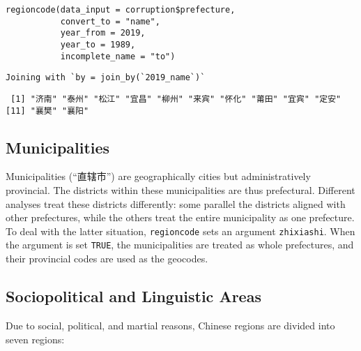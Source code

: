 \documentclass[
  article]{jss}
\begin{document}
\begin{verbatim}
regioncode(data_input = corruption$prefecture, 
           convert_to = "name",
           year_from = 2019,
           year_to = 1989,
           incomplete_name = "to")
\end{verbatim}

\begin{verbatim}
Joining with `by = join_by(`2019_name`)`
\end{verbatim}

\begin{verbatim}
 [1] "济南" "泰州" "松江" "宜昌" "柳州" "来宾" "怀化" "莆田" "宜宾" "定安"
[11] "襄樊" "襄阳"
\end{verbatim}

\hypertarget{municipalities}{%
\subsection{Municipalities}\label{municipalities}}

Municipalities (``直辖市'') are geographically cities but
administratively provincial. The districts within these municipalities
are thus prefectural. Different analyses treat these districts
differently: some parallel the districts aligned with other prefectures,
while the others treat the entire municipality as one prefecture. To
deal with the latter situation, \texttt{regioncode} sets an argument
\texttt{zhixiashi}. When the argument is set \texttt{TRUE}, the
municipalities are treated as whole prefectures, and their provincial
codes are used as the geocodes.

\hypertarget{sociopolitical-and-linguistic-areas}{%
\subsection{Sociopolitical and Linguistic
Areas}\label{sociopolitical-and-linguistic-areas}}

Due to social, political, and martial reasons, Chinese regions are
divided into seven regions:
\end{document}
